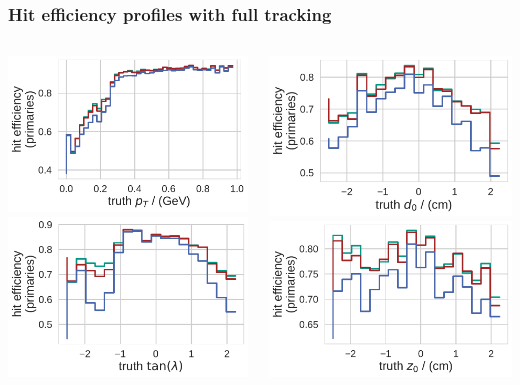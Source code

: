 \documentclass[18pt, aspectratio=169]{beamer}
\begin{document}
\begin{frame}
  \frametitle{Hit efficiency profiles with full tracking}
  \begin{columns}
    \begin{column}{.5\textwidth}
      \centering
      \includegraphics[width=.65\textwidth]{figures/hiteff_by_pt_truth_fullreco.pdf}\\
      \includegraphics[width=.65\textwidth]{figures/hiteff_by_tan_lambda_truth_fullreco.pdf}
    \end{column}    
    \begin{column}{.5\textwidth}
      \centering
      \includegraphics[width=.65\textwidth]{figures/hiteff_by_d0_truth_fullreco.pdf}\\
      \includegraphics[width=.65\textwidth]{figures/hiteff_by_z0_truth_fullreco.pdf}

\end{column}
\end{columns}
\end{frame}
\end{document}
